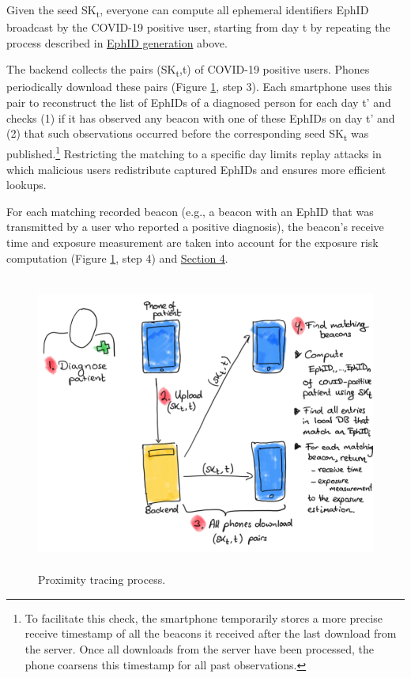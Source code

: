 \documentclass{article}
\begin{document}
Given the seed SK\textsubscript{t}, everyone can compute all ephemeral
identifiers EphID broadcast by the COVID-19 positive user, starting from
day t by repeating the process described in
\protect\hyperlink{creating-ephemeral-ids-ephids}{{EphID generation}}
above.

The backend collects the pairs (SK\textsubscript{t},t) of COVID-19
positive users. Phones periodically download these pairs (Figure \ref{fig:pt_lowcost},
step 3). Each smartphone uses this pair to reconstruct the list of
EphIDs of a diagnosed person for each day t' and checks (1) if it has
observed any beacon with one of these EphIDs on day t' and (2) that such
observations occurred before the corresponding seed SK\textsubscript{t}
was published.\footnote{To facilitate this check, the smartphone
  temporarily stores a more precise receive timestamp of all the beacons
  it received after the last download from the server. Once all
  downloads from the server have been processed, the phone coarsens this
  timestamp for all past observations.} Restricting the matching to a
specific day limits replay attacks in which malicious users redistribute
captured EphIDs and ensures more efficient lookups.

For each matching recorded beacon (e.g., a beacon with an EphID that was
transmitted by a user who reported a positive diagnosis), the beacon's
receive time and exposure measurement are taken into account for the
exposure risk computation (Figure \ref{fig:pt_lowcost}, step 4) and
\protect\hyperlink{exposure-estimation}{{Section 4}}.

\begin{figure}\centering
\includegraphics[width=5.27083in,height=3.83887in]{figs/PT-lowcost.png}
\caption{Proximity tracing process.}
\label{fig:pt_lowcost}
\end{figure}
\end{document}
